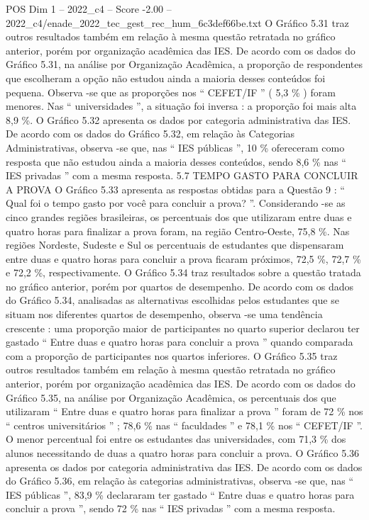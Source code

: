 \begin{textsample}{POS Dim 1 – 2022\_c4 – Score -2.00 – 2022\_c4/enade\_2022\_tec\_gest\_rec\_hum\_6c3def66be.txt}
O Gráfico 5.31 traz outros resultados também em relação à mesma questão retratada no gráfico anterior, porém por organização acadêmica das IES.
De acordo com os dados do Gráfico 5.31, na análise por Organização Acadêmica, a proporção de respondentes que escolheram a opção não estudou ainda a maioria desses conteúdos foi pequena.
Observa -se que as proporções nos “ CEFET/IF ” ( 5,3 \% ) foram menores.
Nas “ universidades ”, a situação foi inversa : a proporção foi mais alta 8,9 \%.
O Gráfico 5.32 apresenta os dados por categoria administrativa das IES.
De acordo com os dados do Gráfico 5.32, em relação às Categorias Administrativas, observa -se que, nas “ IES públicas ”, 10 \% ofereceram como resposta que não estudou ainda a maioria desses conteúdos, sendo 8,6 \% nas “ IES privadas ” com a mesma resposta. 5.7 TEMPO GASTO PARA CONCLUIR A PROVA O Gráfico 5.33 apresenta as respostas obtidas para a Questão 9 : “ Qual foi o tempo gasto por você para concluir a prova? ”.
Considerando -se as cinco grandes regiões brasileiras, os percentuais dos que utilizaram entre duas e quatro horas para finalizar a prova foram, na região Centro-Oeste, 75,8 \%.
Nas regiões Nordeste, Sudeste e Sul os percentuais de estudantes que dispensaram entre duas e quatro horas para concluir a prova ficaram próximos, 72,5 \%, 72,7 \% e 72,2 \%, respectivamente.
O Gráfico 5.34 traz resultados sobre a questão tratada no gráfico anterior, porém por quartos de desempenho.
De acordo com os dados do Gráfico 5.34, analisadas as alternativas escolhidas pelos estudantes que se situam nos diferentes quartos de desempenho, observa -se uma tendência crescente : uma proporção maior de participantes no quarto superior declarou ter gastado “ Entre duas e quatro horas para concluir a prova ” quando comparada com a proporção de participantes nos quartos inferiores.
O Gráfico 5.35 traz outros resultados também em relação à mesma questão retratada no gráfico anterior, porém por organização acadêmica das IES.
De acordo com os dados do Gráfico 5.35, na análise por Organização Acadêmica, os percentuais dos que utilizaram “ Entre duas e quatro horas para finalizar a prova ” foram de 72 \% nos “ centros universitários ” ; 78,6 \% nas “ faculdades ” e 78,1 \% nos “ CEFET/IF ”.
O menor percentual foi entre os estudantes das universidades, com 71,3 \% dos alunos necessitando de duas a quatro horas para concluir a prova.
O Gráfico 5.36 apresenta os dados por categoria administrativa das IES.
De acordo com os dados do Gráfico 5.36, em relação às categorias administrativas, observa -se que, nas “ IES públicas ”, 83,9 \% declararam ter gastado “ Entre duas e quatro horas para concluir a prova ”, sendo 72 \% nas “ IES privadas ” com a mesma resposta.

\end{textsample}

